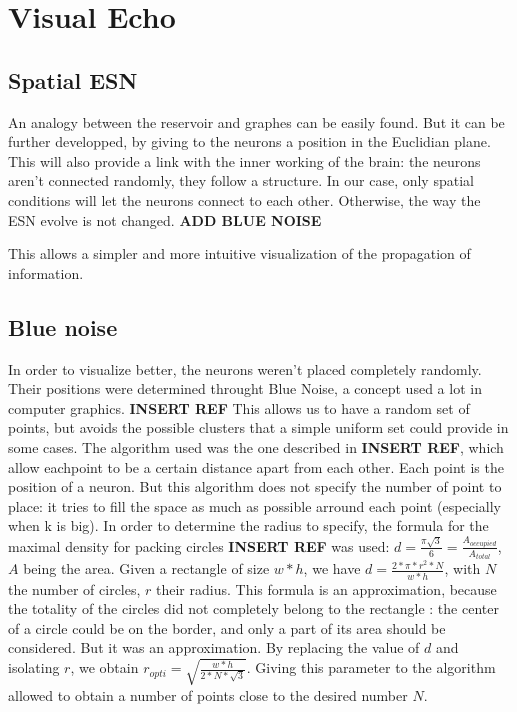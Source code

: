 \documentclass[11pt]{article}
\begin{document}
\section{Visual Echo}
  \subsection{Spatial ESN}
    An analogy between the reservoir and graphes can be easily found. But it can be further developped, by giving to the neurons a position in the Euclidian plane. This will also provide a link with the inner working of the brain: the neurons aren't connected randomly, they follow a structure. In our case, only spatial conditions will let the neurons connect to each other. Otherwise, the way the ESN evolve is not changed. \textbf{ADD BLUE NOISE}

    This allows a simpler and more intuitive visualization of the propagation of information.

  \subsection{Blue noise}
      In order to visualize better, the neurons weren't placed completely randomly. Their positions were determined throught Blue Noise, a concept used a lot in computer graphics. \textbf{INSERT REF} \cite{Rougier2018} This allows us to have a random set of points, but avoids the possible clusters that a simple uniform set could provide in some cases. The algorithm used was the one described in \textbf{INSERT REF}, which allow eachpoint to be a certain distance apart from each other. Each point is the position of a neuron. But this algorithm does not specify the number of point to place: it tries to fill the space as much as possible arround each point (especially when k is big). In order to determine the radius to specify, the formula for the maximal density for packing circles \textbf{INSERT REF} was used: $d = \frac{\pi \sqrt{3}}{6} = \frac{A_{occupied}}{A_{total}}$, $A$ being the area. Given a rectangle of size $w * h$, we have $d = \frac{2* \pi * r^2 * N}{w * h}$, with $N$ the number of circles, $r$ their radius. This formula is an approximation, because the totality of the circles did not completely belong to the rectangle : the center of a circle could be on the border, and only a part of its area should be considered. But it was an approximation. By replacing the value of $d$ and isolating $r$, we obtain $r_{opti} = \sqrt{ \frac{w * h}{2 * N * \sqrt{3} } }$.
      Giving this parameter to the algorithm allowed to obtain a number of points close to the desired number $N$.
\end{document}
